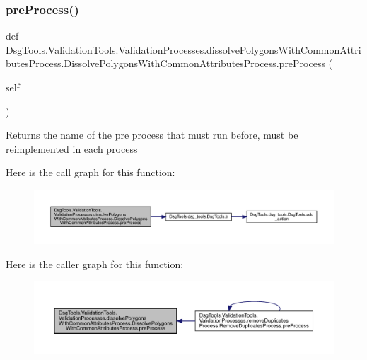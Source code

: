 \subsubsection{\texorpdfstring{pre\+Process()}{preProcess()}}
{\footnotesize\ttfamily def Dsg\+Tools.\+Validation\+Tools.\+Validation\+Processes.\+dissolve\+Polygons\+With\+Common\+Attributes\+Process.\+Dissolve\+Polygons\+With\+Common\+Attributes\+Process.\+pre\+Process (\begin{DoxyParamCaption}\item[{}]{self }\end{DoxyParamCaption})}

\begin{DoxyVerb}Returns the name of the pre process that must run before, must be reimplemented in each process
\end{DoxyVerb}
 Here is the call graph for this function\+:
\nopagebreak
\begin{figure}[H]
\begin{center}
\leavevmode
\includegraphics[width=350pt]{class_dsg_tools_1_1_validation_tools_1_1_validation_processes_1_1dissolve_polygons_with_common_a230ae60d63e86f39f6dd689e1f92a46f_ab46471af34db0ffb678d977da15265cc_cgraph}
\end{center}
\end{figure}
Here is the caller graph for this function\+:
\nopagebreak
\begin{figure}[H]
\begin{center}
\leavevmode
\includegraphics[width=350pt]{class_dsg_tools_1_1_validation_tools_1_1_validation_processes_1_1dissolve_polygons_with_common_a230ae60d63e86f39f6dd689e1f92a46f_ab46471af34db0ffb678d977da15265cc_icgraph}
\end{center}
\end{figure}
\mbox{\label{class_dsg_tools_1_1_validation_tools_1_1_validation_processes_1_1dissolve_polygons_with_common_a230ae60d63e86f39f6dd689e1f92a46f_aba2c4b9d2d29446e1ebdd914c25f38c2}} 
